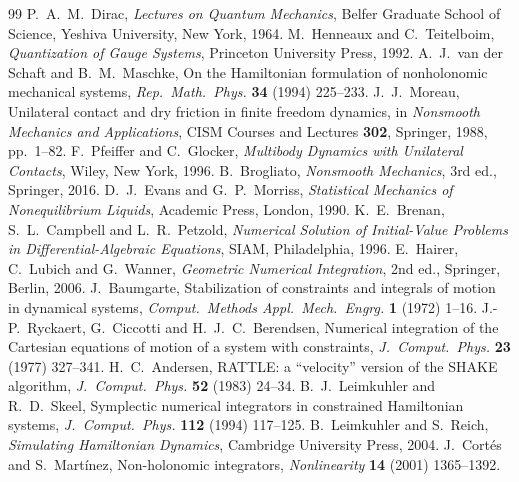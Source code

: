 \documentclass[11pt,a4paper]{article}
\theoremstyle{definition}
\theoremstyle{plain}
\theoremstyle{remark}
\begin{document}
\begin{thebibliography}{99}
 P.~A.~M.~Dirac, \emph{Lectures on Quantum Mechanics}, Belfer Graduate School of Science, Yeshiva University, New York, 1964.
 M.~Henneaux and C.~Teitelboim, \emph{Quantization of Gauge Systems}, Princeton University Press, 1992.
 A.~J.~van der Schaft and B.~M.~Maschke, On the Hamiltonian formulation of nonholonomic mechanical systems, \emph{Rep.\ Math.\ Phys.} \textbf{34} (1994) 225--233.
 J.~J.~Moreau, Unilateral contact and dry friction in finite freedom dynamics, in \emph{Nonsmooth Mechanics and Applications}, CISM Courses and Lectures \textbf{302}, Springer, 1988, pp.~1--82.
 F.~Pfeiffer and C.~Glocker, \emph{Multibody Dynamics with Unilateral Contacts}, Wiley, New York, 1996.
 B.~Brogliato, \emph{Nonsmooth Mechanics}, 3rd ed., Springer, 2016.
 D.~J.~Evans and G.~P.~Morriss, \emph{Statistical Mechanics of Nonequilibrium Liquids}, Academic Press, London, 1990.
 K.~E.~Brenan, S.~L.~Campbell and L.~R.~Petzold, \emph{Numerical Solution of Initial-Value Problems in Differential-Algebraic Equations}, SIAM, Philadelphia, 1996.
 E.~Hairer, C.~Lubich and G.~Wanner, \emph{Geometric Numerical Integration}, 2nd ed., Springer, Berlin, 2006.
 J.~Baumgarte, Stabilization of constraints and integrals of motion in dynamical systems, \emph{Comput.\ Methods Appl.\ Mech.\ Engrg.} \textbf{1} (1972) 1--16.
 J.-P.~Ryckaert, G.~Ciccotti and H.~J.~C.~Berendsen, Numerical integration of the Cartesian equations of motion of a system with constraints, \emph{J.\ Comput.\ Phys.} \textbf{23} (1977) 327--341.
 H.~C.~Andersen, RATTLE: a ``velocity'' version of the SHAKE algorithm, \emph{J.\ Comput.\ Phys.} \textbf{52} (1983) 24--34.
 B.~J.~Leimkuhler and R.~D.~Skeel, Symplectic numerical integrators in constrained Hamiltonian systems, \emph{J.\ Comput.\ Phys.} \textbf{112} (1994) 117--125.
 B.~Leimkuhler and S.~Reich, \emph{Simulating Hamiltonian Dynamics}, Cambridge University Press, 2004.
 J.~Cort\'es and S.~Mart\'inez, Non-holonomic integrators, \emph{Nonlinearity} \textbf{14} (2001) 1365--1392.
\end{thebibliography}
\end{document}
